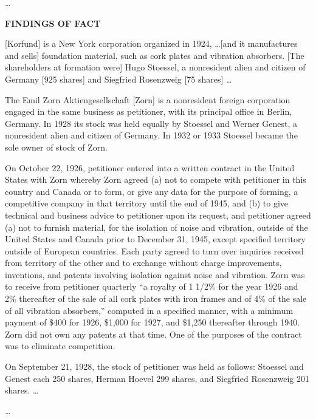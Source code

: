 \begin{select}
\ldots
\begin{center} \textbf{FINDINGS OF FACT}
\end{center}
[Korfund] is a New York corporation organized in 1924, \ldots [and it manufactures and sells] foundation material, such as cork plates and vibration absorbers. [The shareholders at formation were] Hugo Stoessel, a nonresident alien and citizen of Germany [925 shares] and Siegfried Rosenzweig [75 shares] \ldots

The Emil Zorn Aktiengesellschaft [Zorn] is a nonresident foreign corporation engaged in the same business as petitioner, with its principal office in Berlin, Germany. In 1928 its stock was held equally by Stoessel and Werner Genest, a nonresident alien and citizen of Germany. In 1932 or 1933 Stoessel became the sole owner of stock of Zorn.

On October 22, 1926, petitioner entered into a written contract in the United States with Zorn whereby Zorn agreed (a) not to compete with petitioner in this country and Canada or to form, or give any data for the purpose of forming, a competitive company in that territory until the end of 1945, and (b) to give technical and business advice to petitioner upon its request, and petitioner agreed (a) not to furnish material, for the isolation of noise and vibration, outside of the United States and Canada prior to December 31, 1945, except specified territory outside of European countries. Each party agreed to turn over inquiries received from territory of the other and to exchange without charge improvements, inventions, and patents involving isolation against noise and vibration. Zorn was to receive from petitioner quarterly ``a royalty of 1 1/2\% for the year 1926 and 2\% thereafter of the sale of all cork plates with iron frames and of 4\% of the sale of all vibration absorbers,'' computed in a specified manner, with a minimum payment of \$400 for 1926, \$1,000 for 1927, and \$1,250 thereafter through 1940. Zorn did not own any patents at that time. One of the purposes of the contract was to eliminate competition.

On September 21, 1928, the stock of petitioner was held as follows: Stoessel and Genest each 250 shares, Herman Hoevel 299 shares, and Siegfried Rosenzweig 201 shares. \dots

\ldots


\end{select}
